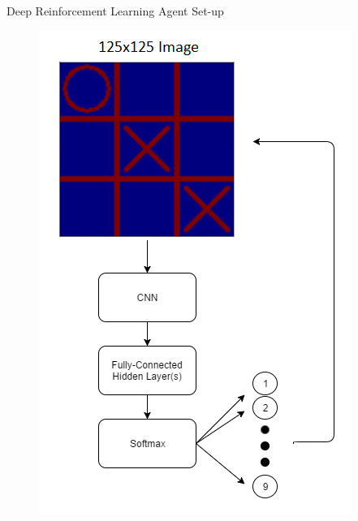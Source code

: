 \documentclass[11pt]{beamer}
\begin{document}
\begin{frame}{Deep Reinforcement Learning Agent Set-up}
\begin{minipage}[t]{0.45\linewidth}
\begin{figure}[tttDL]
			\includegraphics[width=.95\textwidth]{Figures/deeptictactoe.png}
		\end{figure}
	\end{minipage}
	
\end{frame}
\end{document}
